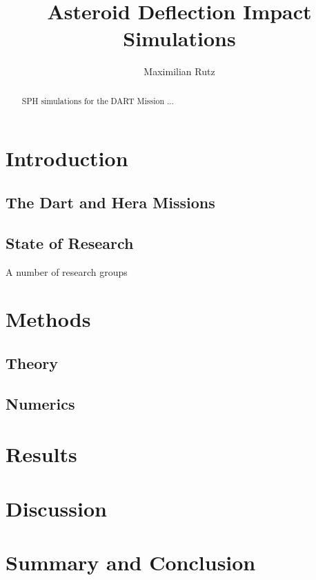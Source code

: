 \documentclass{article}
\title{Asteroid Deflection Impact Simulations}
\author{Maximilian Rutz}
\date{}
\begin{document}
\maketitle
\begin{abstract}
    SPH simulations for the DART Mission ...
\end{abstract}

\newpage
\tableofcontents

\newpage
\section{Introduction}

\subsection{The Dart and Hera Missions}

\subsection{State of Research}
A number of research groups \cite{Jutzi_p_alpha_1}
\section{Methods}
\subsection{Theory}
\subsection{Numerics}
\section{Results}
\section{Discussion}
\section{Summary and Conclusion}

\newpage
\printbibliography
\end{document}
